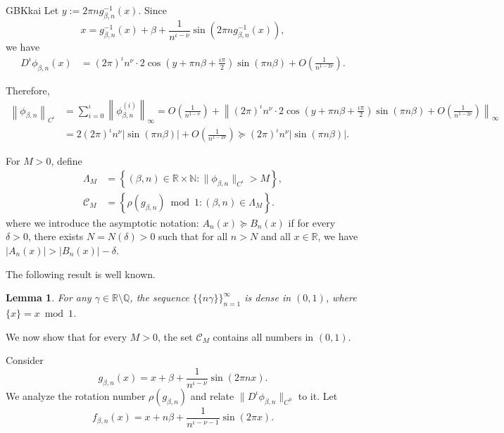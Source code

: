 \documentclass{amsart}
\newtheorem{Lemma}[Definition]{Lemma}
\theoremstyle{definition}
\begin{document}
\begin{CJK*}{GBK}{kai}
Let $y := 2\pi n g_{\beta,n}^{-1}(x)$. Since
\[
x = g_{\beta,n}^{-1}(x) + \beta + \frac{1}{n^{\iota-\nu}}\sin\left(2\pi n g_{\beta,n}^{-1}(x)\right),
\]
we have
\begin{align*}
D^{\iota}\phi_{\beta,n}(x)
&= (2\pi)^{\iota} n^{\nu} \cdot 2\cos\left(y + \pi n \beta + \frac{\iota\pi}{2}\right) \sin\left(\pi n \beta\right)
+ O\left(\frac{1}{n^{1-2\nu}}\right).
\end{align*}

Therefore,
\begin{align*}
\left\|\phi_{\beta,n}\right\|_{C^{\iota}}
&= \sum_{i=0}^{\iota}\left\|\phi_{\beta,n}^{(i)}\right\|_\infty
= O\left(\frac{1}{n^{1-\nu}}\right)
+ \left\|(2\pi)^{\iota} n^{\nu} \cdot 2\cos\left(y + \pi n \beta + \frac{\iota\pi}{2}\right) \sin\left(\pi n \beta\right)
+ O\left(\frac{1}{n^{1-2\nu}}\right)\right\|_\infty \\
&= 2(2\pi)^{\iota} n^{\nu} \left|\sin(\pi n \beta)\right| + O\left(\frac{1}{n^{1-2\nu}}\right)
\succcurlyeq (2\pi)^{\iota} n^{\nu} \left|\sin(\pi n \beta)\right|.
\end{align*}

For $M > 0$, define
\begin{align*}
\Lambda_M &= \left\{ (\beta, n) \in \mathbb{R} \times \mathbb{N} : \|\phi_{\beta,n}\|_{C^{\iota}} > M \right\}, \\
\mathcal{C}_M &= \left\{ \rho(g_{\beta,n}) \bmod 1 : (\beta, n) \in \Lambda_M \right\}.
\end{align*}
where  we introduce the  asymptotic notation:
 \( A_n(x) \succcurlyeq B_n(x) \) if for every \( \delta > 0 \), there exists \( N = N(\delta) > 0 \) such that for all \( n > N \) and all \( x \in \mathbb{R} \), we have \( |A_n(x)| > |B_n(x)| - \delta \).


The following result is well known.
\begin{Lemma} \label{YRX}
For any $\gamma \in \mathbb{R} \setminus \mathbb{Q}$, the sequence $\{\{n\gamma\}\}_{n=1}^{\infty}$ is dense in $(0,1)$, where $\{x\} = x \bmod 1$.
\end{Lemma}
We now show that for every \( M > 0 \), the set \( \mathcal{C}_M \) contains all numbers in \( (0,1) \).

Consider
\[
g_{\beta,n}(x) = x + \beta + \frac{1}{n^{\iota-\nu}} \sin(2\pi n x).
\]
We analyze the rotation number \( \rho(g_{\beta,n}) \) and relate \( \|D^{\iota}\phi_{\beta,n}\|_{C^0} \) to it. Let
\begin{equation}\label{fbe}
f_{\beta,n}(x) = x + n\beta + \frac{1}{n^{\iota-\nu-1}} \sin(2\pi x).
\end{equation}


\end{CJK*}
\end{document}
